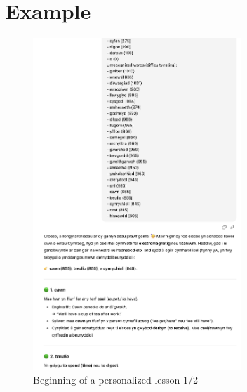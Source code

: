 \section{Example}
\begin{figure}[h]
    \centering
    \includegraphics[width=0.7\textwidth]{figures/lesson-1.png}
    \caption{Beginning of a personalized lesson 1/2}
    \label{fig:lesson1}
\end{figure}
